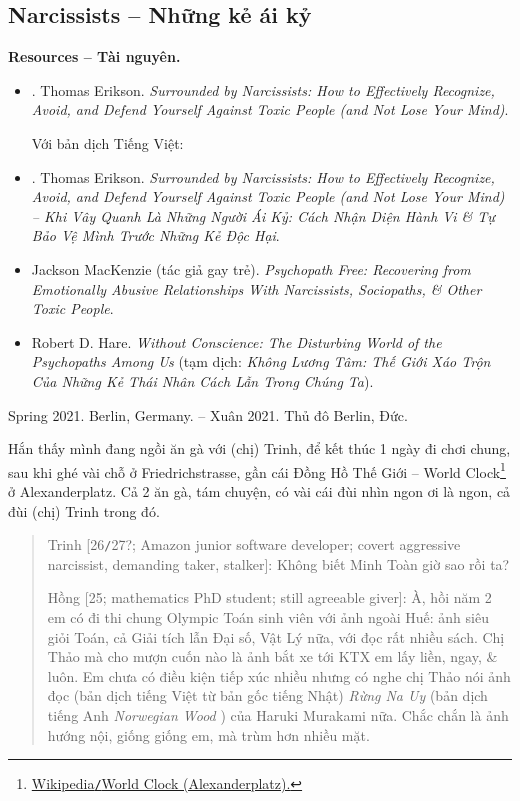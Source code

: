 \documentclass[12pt,twoside]{book}
\begin{document}
\subsection{Narcissists -- Những kẻ ái kỷ}
{\bf \textsf{Resources -- Tài nguyên.}}
\begin{itemize}
	\item \cite{Erikson_narcisisst}. {\sc Thomas Erikson}. {\it Surrounded by Narcissists: How to Effectively Recognize, Avoid, and Defend Yourself Against Toxic People (and Not Lose Your Mind)}.
	
	Với bản dịch Tiếng Việt:
	\item \cite{Erikson_narcisisst_VN}. {\sc Thomas Erikson}. {\it Surrounded by Narcissists: How to Effectively Recognize, Avoid, and Defend Yourself Against Toxic People (and Not Lose Your Mind) -- Khi Vây Quanh Là Những Người Ái Kỷ: Cách Nhận Diện Hành Vi \& Tự Bảo Vệ Mình Trước Những Kẻ Độc Hại}.
	\item \cite{MacKenzie2015} {\sc Jackson MacKenzie} (tác giả gay trẻ). {\it Psychopath Free: Recovering from Emotionally Abusive Relationships With Narcissists, Sociopaths, \& Other Toxic People}.
	\item \cite{Hare1999} {\sc Robert D. Hare}. {\it Without Conscience: The Disturbing World of the Psychopaths Among Us} (tạm dịch: {\it Không Lương Tâm: Thế Giới Xáo Trộn Của Những Kẻ Thái Nhân Cách Lẫn Trong Chúng Ta}).
\end{itemize}
\begin{flushright}
	Spring 2021. Berlin, Germany. -- Xuân 2021. Thủ đô Berlin, Đức.
\end{flushright}
Hắn thấy mình đang ngồi ăn gà với (chị) Trinh, để kết thúc 1 ngày đi chơi chung, sau khi ghé vài chỗ ở Friedrichstrasse, gần cái Đồng Hồ Thế Giới -- World Clock\footnote{\href{https://en.wikipedia.org/wiki/World_Clock_(Alexanderplatz)}{Wikipedia{\tt/}World Clock (Alexanderplatz).}} ở Alexanderplatz. Cả 2 ăn gà, tám chuyện, có vài cái đùi nhìn ngon ơi là ngon, cả đùi (chị) Trinh trong đó. 
\begin{quote}
	{\sf Trinh [26{\tt/}27?; Amazon junior software developer; covert aggressive narcissist, demanding taker, stalker]}: Không biết Minh Toàn giờ sao rồi ta?
	
	{\sf Hồng [25; mathematics PhD student; still agreeable giver]}: À, hồi năm 2 em có đi thi chung Olympic Toán sinh viên với ảnh ngoài Huế: ảnh siêu giỏi Toán, cả Giải tích lẫn Đại số, Vật Lý nữa, với đọc rất nhiều sách. Chị Thảo mà cho mượn cuốn nào là ảnh bắt xe tới KTX em lấy liền, ngay, \& luôn. Em chưa có điều kiện tiếp xúc nhiều nhưng có nghe chị Thảo nói ảnh đọc (bản dịch tiếng Việt từ bản gốc tiếng Nhật) {\it Rừng Na Uy} \cite{Murakami_rung_Na_Uy} (bản dịch tiếng Anh {\it Norwegian Wood} \cite{Murakami_Norwegian_wood}) của {\sc Haruki Murakami} nữa. Chắc chắn là ảnh hướng nội, giống giống em, mà trùm hơn nhiều mặt.
\end{quote}
\end{document}
